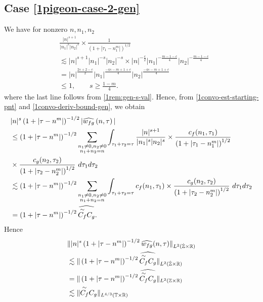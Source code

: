 \subsection{Case \eqref{1pigeon-case-2-gen}}
We have for nonzero $ n, n_1, n_2 $
%
\begin{equation}
	\label{1convo-deriv-bound-gen}
	\begin{split}
		& \frac{|n|^{s+1}}{|n_1|^s 
		| n_2|^s}
		\times
		\frac{1}{(1 + | \tau_1 -n_1^m |)^{1/2}}
		\\
		& \lesssim | n |^{s+1}| n_1 |^{-s}| n_2 |^{-s} \times | n
		|^{-\frac{c}{2}}| n_1 |^{-\frac{m-1-c}{4}}| n_2 |^{-\frac{m-1-c}{4}} 
		\\
		& = | n |^{\frac{2s+2 -c}{2}} | n_1 |^{\frac{-4s -m + 1+ c}{4}} | n_2
		|^\frac{-4s -m + 1+ c}{4}
		\\
		& \le 1, \qquad s \ge \frac{1-m}{4}.
	\end{split}  
\end{equation}
%
%
where the last line follows from \cref{1rem:gen-s-val}.
Hence, from \eqref{1convo-est-starting-pnt} and \eqref{1convo-deriv-bound-gen},
we obtain 
\begin{equation}
	\label{1convo-est-starting-pnt-gen}
	\begin{split}
		 & |n|^s \left( 1 + | \tau - n^m | \right)^{-1/2} | \widehat{w_{fg}}\left( 
		n, \tau \right) |
		\\
		& \le \left( 1 + | \tau - n^m | \right)^{-1/2}
		\sum_{\substack{n_1 \neq0, n_2 \neq 0 \\n_1 + n_2 =n}} \int_{\tau_1 + \tau_2 = \tau}\frac{|n|^{s+1}}{|n_1|^s | n_2|^s} 
		\times \frac{c_f(n_1, \tau_1)}{\left( 1 + | \tau_1 - n_1^m | 
		\right)^{1/2}}
		\\
		& \times
		\frac{c_g(n_2, \tau_2)}{\left( 1 + | \tau_2 - n_2^m | 
		\right)^{1/2}}\ d \tau_1 d \tau_2
		\\
		& \lesssim \left( 1 + | \tau - n^m | \right)^{-1/2}
		\sum_{\substack{n_1 \neq0, n_2 \neq 0 \\n_1 + n_2 =n}} \int_{\tau_1 + \tau_2
		= \tau} c_f(n_1, \tau_1) \times
		\frac{c_g(n_2, \tau_2)}{\left( 1 + | \tau_2 - n_2^m | 
		\right)^{1/2}}\ d \tau_1 d \tau_2
		\\
		& = \left( 1 + | \tau - n^m | \right)^{-1/2}
\widehat{\overset{\sim}{C_f} C_g}.
	\end{split}
\end{equation}
%
%
%
Hence
%
\begin{equation}
	\label{13f-gen}
	\begin{split}
		& \| |n|^s \left( 1 + | \tau - n^m | \right)^{-1/2} \widehat{w_{fg}}(n, \tau) 
		\|_{L^2(\dot{\mathbb{Z}} \times \mathbb{R})}
		\\
		& \lesssim \|\left( 1 + | \tau - n^m | \right)^{-1/2} 
		\widehat{\overset{\sim}{C_f} C_g } \|_{L^2(\dot{\mathbb{Z}} \times \mathbb{R})}
		\\
		& =  \|\left( 1 + | \tau - n^m | \right)^{-1/2} 
		\widehat{\overset{\sim}{C_f} C_g } \|_{L^2(\mathbb{Z} \times \mathbb{R})}
		\\
		& \lesssim  \|\overset{\sim}{C_f} C_g  \|_{L^{4/3}(\mathbb{T} \times \mathbb{R})}
	\end{split}
\end{equation}
